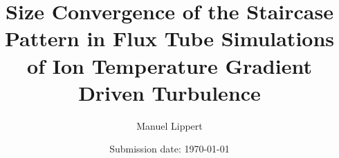\titlehead{
    \centering
    \texttt{[image: Uni\_Logo\_white\_black.png]}
}

\subject{\normalfont Bachelor Thesis}
\title{Size Convergence of the \boldmath{$\exb$} Staircase Pattern in Flux Tube Simulations of Ion Temperature Gradient Driven Turbulence}
\author{Manuel Lippert}
\date{Submission date: \today}
\publishers{\textbf{Instuitute for Theoretical Plasma Physics}\\
\vspace*{2em}
Supervisors:\\
Prof.\,Arthur\,G.\,Peeters\\
Dr.\,Florian\,Rath
}